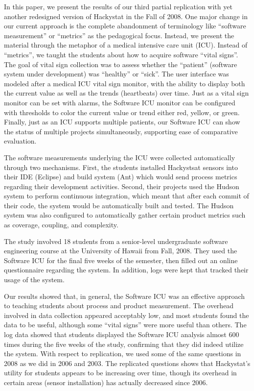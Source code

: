 \documentclass{acm_proc_article-sp}
\begin{document}
In this paper, we present the results of our third partial replication with
yet another redesigned version of Hackystat in the Fall of 2008.  One major
change in our current approach is the complete abandonment of terminology
like ``software measurement'' or ``metrics'' as the pedagogical focus.
Instead, we present the material through the metaphor of a medical
intensive care unit (ICU).  Instead of ``metrics'', we taught the students
about how to acquire software ``vital signs''.  The goal of vital sign
collection was to assess whether the ``patient'' (software system under
development) was ``healthy'' or ``sick''.  The user interface was modeled
after a medical ICU vital sign monitor, with the ability to display both
the current value as well as the trends (heartbeats) over time.  Just as a
vital sign monitor can be set with alarms, the Software ICU monitor can be
configured with thresholds to color the current value or trend either red,
yellow, or green.  Finally, just as an ICU supports multiple patients, our
Software ICU can show the status of multiple projects simultaneously,
supporting ease of comparative evaluation.

The software measurements underlying the ICU were collected automatically
through two mechanisms. First, the students installed Hackystsat sensors
into their IDE (Eclipse) and build system (Ant) which would send process
metrics regarding their development activities.  Second, their projects
used the Hudson system to perform continuous integration, which meant that
after each commit of their code, the system would be automatically built
and tested.  The Hudson system was also configured to automatically gather
certain product metrics such as coverage, coupling, and complexity.

The study involved 18 students from a senior-level undergraduate software
engineering course at the University of Hawaii from Fall, 2008.  They used
the Software ICU for the final five weeks of the semester, then filled out
an online questionnaire regarding the system.  In addition, logs were kept
that tracked their usage of the system.

Our results showed that, in general, the Software ICU was an effective
approach to teaching students about process and product measurement.  The
overhead involved in data collection appeared acceptably low, and most
students found the data to be useful, although some ``vital signs'' were
more useful than others.  The log data showed that students displayed the
Software ICU analysis almost 600 times during the five weeks of the study,
confirming that they did indeed utilize the system. With respect to
replication, we used some of the same questions in 2008 as we did in 2006
and 2003.  The replicated questions shows that Hackystat's utility for
students appears to be increasing over time, though its overhead in certain
areas (sensor installation) has actually decreased since 2006.
\end{document}
